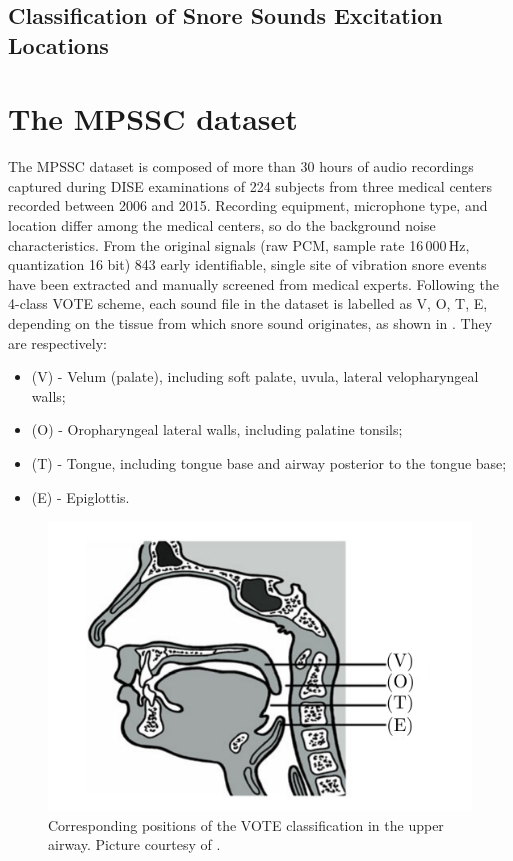 \subsection{Classification of Snore Sounds Excitation Locations}

\section{The MPSSC dataset}
\label{section:dataset}
The MPSSC dataset is composed of more than 30 hours of audio recordings captured during DISE examinations of 224 subjects from three medical centers recorded between 2006 and 2015. Recording equipment, microphone type, and location differ among the medical centers, so do the background noise characteristics. From the original signals (raw PCM, sample rate 16\,000\,Hz, quantization 16 bit) 843 early identifiable, single site of vibration snore events have been extracted and manually screened from medical experts.
Following the 4-class VOTE scheme, each sound file in the dataset is labelled as V, O, T, E, depending on the tissue from which snore sound originates, as shown in . They are respectively:
\begin{itemize}
	\item (V) - Velum (palate), including soft palate, uvula, lateral
	velopharyngeal walls;
	\item (O) - Oropharyngeal lateral walls, including palatine tonsils;
	\item (T) - Tongue, including tongue base and airway posterior to the tongue base;
	\item (E) - Epiglottis.
\end{itemize}

\begin{figure}[t]
	\centering
	\includegraphics[width=0.6\linewidth]{img/vote.pdf}
	\caption[VOTE positions]{Corresponding positions of the VOTE classification in the upper airway. Picture courtesy of \cite{janott2014akustical}.} 
	\label{fig:vote}
\end{figure}


